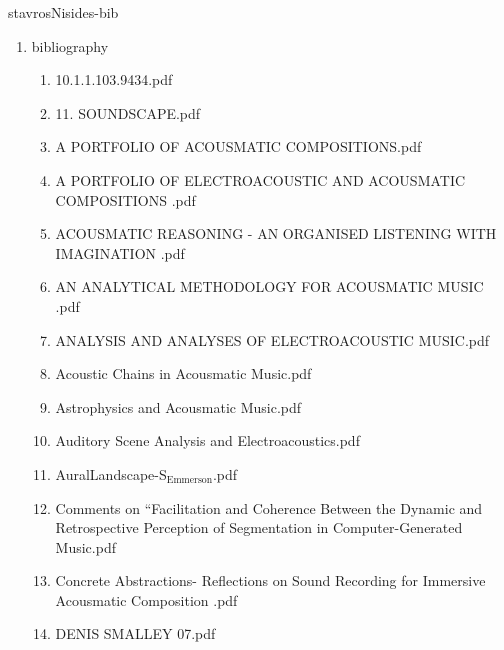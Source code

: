 \documentclass[11pt]{article}
\begin{document}
\item stavrosNisides-bib
\label{sec-1-1-1-1-11-19-29}
\begin{enumerate}
\item bibliography
\label{sec-1-1-1-1-11-19-29-1}
\begin{enumerate}
\item 10.1.1.103.9434.pdf
\label{sec-1-1-1-1-11-19-29-1-1}

\item 11. SOUNDSCAPE.pdf
\label{sec-1-1-1-1-11-19-29-1-2}

\item A PORTFOLIO OF ACOUSMATIC COMPOSITIONS.pdf
\label{sec-1-1-1-1-11-19-29-1-3}

\item A PORTFOLIO OF ELECTROACOUSTIC AND ACOUSMATIC COMPOSITIONS  .pdf
\label{sec-1-1-1-1-11-19-29-1-4}

\item ACOUSMATIC REASONING - AN ORGANISED LISTENING WITH  IMAGINATION  .pdf
\label{sec-1-1-1-1-11-19-29-1-5}

\item AN ANALYTICAL METHODOLOGY FOR ACOUSMATIC  MUSIC .pdf
\label{sec-1-1-1-1-11-19-29-1-6}

\item ANALYSIS AND ANALYSES OF ELECTROACOUSTIC MUSIC.pdf
\label{sec-1-1-1-1-11-19-29-1-7}

\item Acoustic Chains in Acousmatic Music.pdf
\label{sec-1-1-1-1-11-19-29-1-8}

\item Astrophysics and  Acousmatic Music.pdf
\label{sec-1-1-1-1-11-19-29-1-9}

\item Auditory Scene Analysis and Electroacoustics.pdf
\label{sec-1-1-1-1-11-19-29-1-10}

\item AuralLandscape-S$_{\text{Emmerson}}$.pdf
\label{sec-1-1-1-1-11-19-29-1-11}

\item Comments on “Facilitation and Coherence Between  the Dynamic and Retrospective Perception of  Segmentation in Computer-Generated Music.pdf
\label{sec-1-1-1-1-11-19-29-1-12}

\item Concrete Abstractions- Reflections on Sound Recording for  Immersive Acousmatic Composition .pdf
\label{sec-1-1-1-1-11-19-29-1-13}

\item DENIS SMALLEY 07.pdf
\label{sec-1-1-1-1-11-19-29-1-14}


\end{enumerate}
\end{enumerate}
\end{document}
